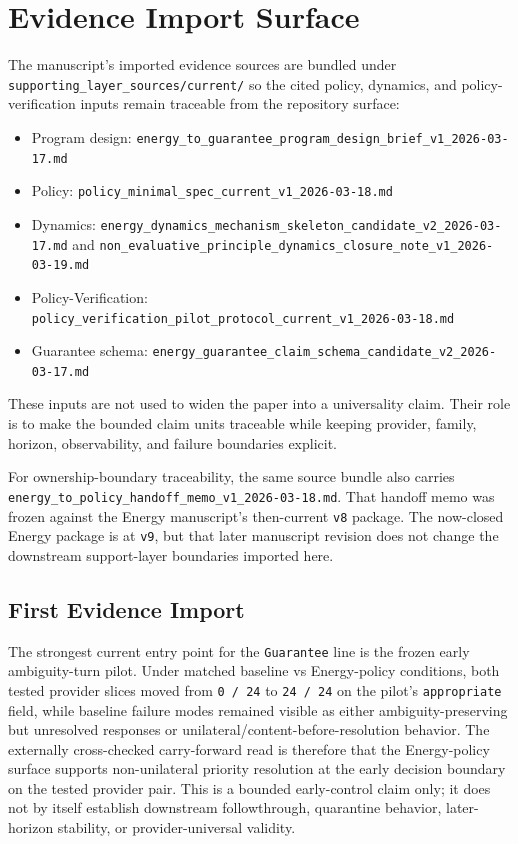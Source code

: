 \documentclass[11pt]{article}
\begin{document}
\section{Evidence Import Surface}

The manuscript's imported evidence sources are bundled under
\texttt{supporting\_layer\_sources/current/} so the cited policy, dynamics,
and policy-verification inputs remain traceable from the repository surface:

\begin{itemize}
\item Program design:
  \texttt{energy\_to\_guarantee\_program\_design\_brief\_v1\_2026-03-17.md}
\item Policy:
  \texttt{policy\_minimal\_spec\_current\_v1\_2026-03-18.md}
\item Dynamics:
  \texttt{energy\_dynamics\_mechanism\_skeleton\_candidate\_v2\_2026-03-17.md}
  and
  \texttt{non\_evaluative\_principle\_dynamics\_closure\_note\_v1\_2026-03-19.md}
\item Policy-Verification:
  \texttt{policy\_verification\_pilot\_protocol\_current\_v1\_2026-03-18.md}
\item Guarantee schema:
  \texttt{energy\_guarantee\_claim\_schema\_candidate\_v2\_2026-03-17.md}
\end{itemize}

These inputs are not used to widen the paper into a universality claim. Their
role is to make the bounded claim units traceable while keeping provider,
family, horizon, observability, and failure boundaries explicit.

For ownership-boundary traceability, the same source bundle also carries
\texttt{energy\_to\_policy\_handoff\_memo\_v1\_2026-03-18.md}. That handoff memo
was frozen against the Energy manuscript's then-current \texttt{v8} package.
The now-closed Energy package is at \texttt{v9}, but that later manuscript
revision does not change the downstream support-layer boundaries imported here.

\subsection{First Evidence Import}

The strongest current entry point for the \texttt{Guarantee} line is the frozen
early ambiguity-turn pilot. Under matched baseline vs Energy-policy conditions,
both tested provider slices moved from \texttt{0 / 24} to \texttt{24 / 24} on the
pilot's \texttt{appropriate} field, while baseline failure modes remained visible
as either ambiguity-preserving but unresolved responses or
unilateral/content-before-resolution behavior. The externally cross-checked
carry-forward read is therefore that the Energy-policy surface supports
non-unilateral priority resolution at the early decision boundary on the tested
provider pair. This is a bounded early-control claim only; it does not by itself
establish downstream followthrough, quarantine behavior, later-horizon stability,
or provider-universal validity.
\end{document}
